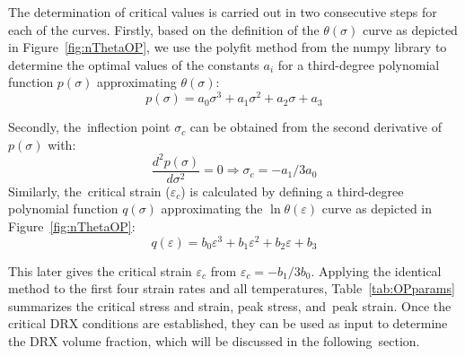 \documentclass[metals,article,accept,pdftex,moreauthors]{Definitions/mdpi}
\begin{document}
The determination of critical values is carried out in two consecutive steps for each of the curves.
Firstly, based on the definition of the $\theta(\sigma)$ curve as depicted in Figure~\ref{fig:nThetaOP}, we use the polyfit method from the numpy library to determine the optimal values of the constants $a_i$ for a third-degree polynomial function $p(\sigma)$ approximating $\theta(\sigma)$:
\begin{equation}
p(\sigma) = a_0\sigma^3 + a_1\sigma^2 + a_2\sigma + a_3
\end{equation}

Secondly, %
 the~inflection point $\sigma_c$ can be obtained from the second derivative of $p(\sigma)$ with:
\begin{equation}
\frac{d^2 p(\sigma)}{d \sigma^2} = 0 \Longrightarrow \sigma_c = -a_1/3a_0
\end{equation}
Similarly, %
 the~critical strain ($\varepsilon_c$) is calculated by defining a third-degree polynomial function $q(\sigma)$ approximating the $\ln \theta(\varepsilon)$ curve as depicted in Figure~\ref{fig:nThetaOP}:
\begin{equation}
q(\varepsilon) = b_0\varepsilon^3 + b_1\varepsilon^2 + b_2\varepsilon + b_3
\end{equation}

This %
 later gives the critical strain $\varepsilon_c$ from $\varepsilon_c = -b_1/3b_0$.
Applying the identical method to the first four strain rates and all temperatures, Table~\ref{tab:OPparams} summarizes the critical stress and strain, peak stress, and~peak strain.
Once the critical DRX conditions are established, they can be used as input to determine the DRX volume fraction, which will be discussed in the following~section.
\end{document}
